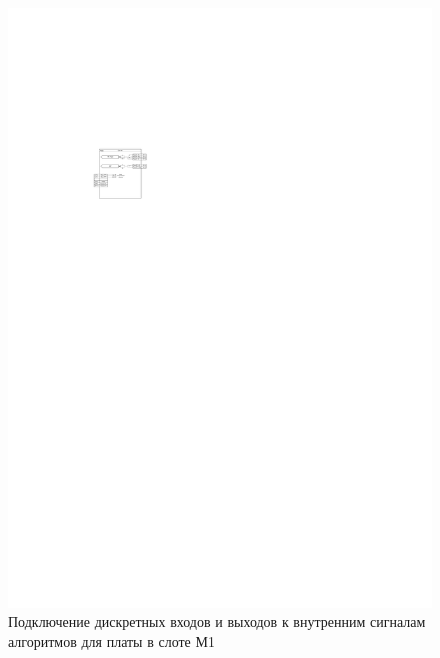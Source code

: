\documentclass[a4paper, 12pt,table, hidelinks, DIV=calc]{extarticle} %
\begin{document}
\begin{appendices}
\begin{landscape}
\begin{figure}[h!]
  \centering
  \hspace*{-1cm} %
  \includegraphics[width=1.5\textwidth]{img44.pdf}
  \caption{Подключение дискретных входов и выходов к внутренним сигналам алгоритмов для платы в слоте М1}
  \label{fig:sig1} %
\end{figure}


\end{landscape}
\end{appendices}
\end{document}
